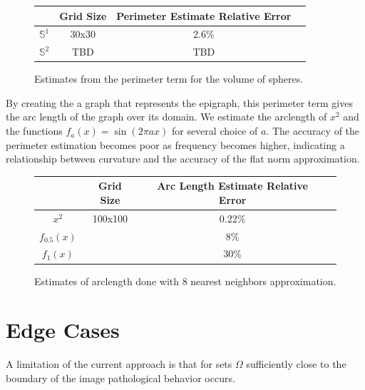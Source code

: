 \documentclass[12pt]{article}
\begin{document}
\begin{figure}[H]
	\centering
	\begin{tabular}{|c|c|c|c|}
		\hline
		&  Grid Size & Perimeter Estimate Relative Error  \\
		\hline
		$\mathbb{S}^1$ & 30x30 &  2.6\%  \\
		\hline
		$\mathbb{S}^2$ & TBD & TBD    \\
		\hline
	\end{tabular}
	\caption{Estimates from the perimeter term for the volume of spheres.}
\end{figure}

By creating the a graph that represents the epigraph, this perimeter term gives the arc length of the graph over its domain. We estimate the arclength of $x^2$ and the functions $f_a(x) = \sin(2\pi ax)$ for several choice of $a$. The accuracy of the perimeter estimation becomes poor as frequency becomes higher, indicating a relationship between curvature and the accuracy of the flat norm approximation.

\begin{figure}[H]
	\centering
	\begin{tabular}{|c|c|c|c|}
		\hline
		&  Grid Size & Arc Length Estimate Relative Error  \\
		\hline
		$x^2$ & 100x100 &  0.22\%  \\
		\hline
		$f_{0.5}(x)$ &  & 8\%    \\
		\hline
		$f_{1}(x)$ &  & 30\%    \\
		\hline
	\end{tabular}
	\caption{Estimates of arclength done with 8 nearest neighbors approximation.}
\end{figure}

\section{Edge Cases}

A limitation of the current approach is that for sets $\Omega$ sufficiently close to the boundary of the image pathological behavior occurs.



\end{document}
